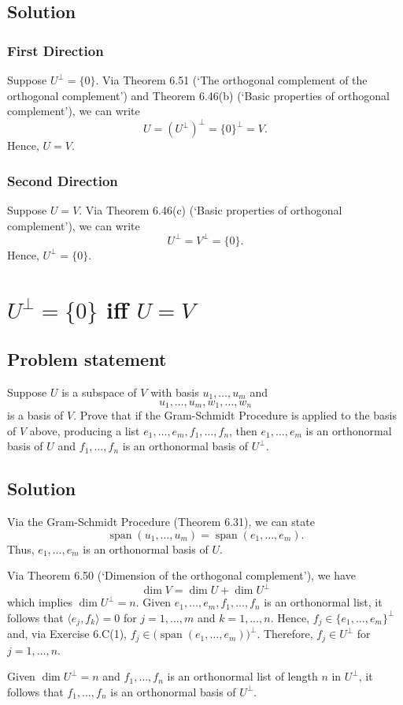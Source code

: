\documentclass{article}
\begin{document}
\subsection*{Solution}
\subsubsection*{First Direction}
Suppose $U^\bot=\{0\}$. 
Via Theorem 6.51 (`The orthogonal complement of the orthogonal complement') and Theorem 6.46(b) (`Basic properties of orthogonal complement'), we can write
\[U=(U^\bot)^\bot=\{0\}^\bot=V.\]
Hence, $U=V$.

\subsubsection*{Second Direction}
Suppose $U=V$. 
Via Theorem 6.46(c) (`Basic properties of orthogonal complement'), we can write
\[U^\bot=V^\bot=\{0\}.\]
Hence, $U^\bot=\{0\}$.

\clearpage

\section{$U^\bot=\{0\}$ iff $U=V$}
\subsection*{Problem statement}
Suppose $U$ is a subspace of $V$ with basis $u_1,\ldots,u_m$ and
\[u_1,\ldots,u_m,w_1,\ldots,w_n\]
is a basis of $V$. 
Prove that if the Gram-Schmidt Procedure is applied to the basis of $V$ above, producing a list $e_1,\ldots,e_m,f_1,\ldots,f_n$, then $e_1,\ldots,e_m$ is an orthonormal basis of $U$ and $f_1,\ldots,f_n$ is an orthonormal basis of $U^\bot$.

\subsection*{Solution}
Via the Gram-Schmidt Procedure (Theorem 6.31), we can state
\[\operatorname{span}(u_1,\ldots,u_m)=\operatorname{span}(e_1,\ldots,e_m).\]
Thus, $e_1,\ldots,e_m$ is an orthonormal basis of $U$. 

Via Theorem 6.50 (`Dimension of the orthogonal complement'), we have 
\[\dim V= \dim U+\dim U^\bot\]
which implies $\dim U^\bot=n$. 
Given $e_1,\ldots,e_m,f_1,\ldots,f_n$ is an orthonormal list, it follows that $\langle e_j, f_k\rangle=0$ for $j=1,\ldots,m$ and $k=1,\ldots,n$. 
Hence, \newline$f_j\in\{ e_1,\ldots, e_m\}^\bot$ and, via Exercise 6.C(1), $f_j\in\big(\operatorname{span}(e_1,\ldots,e_m)\big)^\bot$.
Therefore, $f_j\in U^\bot$ for $j=1,\ldots,n$.

Given $\dim U^\bot=n$ and $f_1,\ldots,f_n$ is an orthonormal list of length $n$ in $U^\bot$, it follows that $f_1,\ldots,f_n$ is an orthonormal basis of $U^\bot$.
\end{document}
